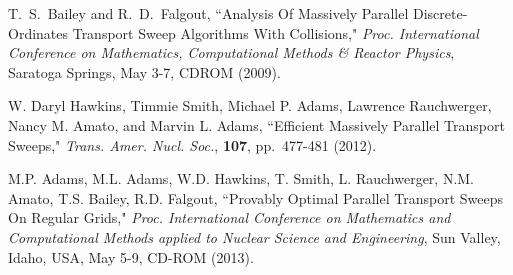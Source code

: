 \begin{thebibliography}{300}
 T.\ S.\ Bailey and R.\ D.\ Falgout, ``Analysis Of Massively Parallel Discrete-Ordinates Transport Sweep Algorithms With Collisions," {\em Proc. International Conference on Mathematics, Computational Methods \& Reactor Physics}, Saratoga Springs, May 3-7, CDROM (2009).

 W. Daryl Hawkins, Timmie Smith, Michael P. Adams, Lawrence Rauchwerger, Nancy M. Amato, and Marvin L. Adams, ``Efficient Massively Parallel Transport Sweeps," {\it Trans. Amer. Nucl. Soc.}, {\bf 107}, pp.\ 477-481 (2012).

 M.P. Adams, M.L. Adams, W.D. Hawkins, T. Smith, L. Rauchwerger, N.M. Amato, T.S. Bailey, R.D. Falgout, ``Provably Optimal Parallel Transport Sweeps On Regular Grids," {\em Proc. International Conference on Mathematics and Computational Methods applied to Nuclear Science and Engineering}, Sun Valley, Idaho, USA, May 5-9, CD-ROM (2013).


\end{thebibliography}
